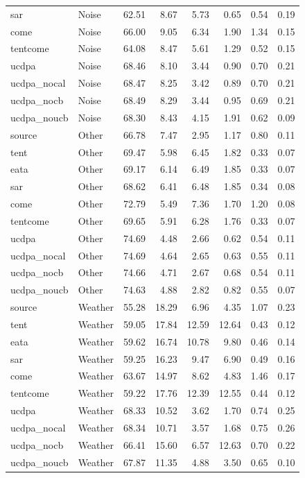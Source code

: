 \begin{tabular}{llrrrrrr}
sar & Noise & 62.51 & 8.67 & 5.73 & 0.65 & 0.54 & 0.19 \\
come & Noise & 66.00 & 9.05 & 6.34 & 1.90 & 1.34 & 0.15 \\
tentcome & Noise & 64.08 & 8.47 & 5.61 & 1.29 & 0.52 & 0.15 \\
ucdpa & Noise & 68.46 & 8.10 & 3.44 & 0.90 & 0.70 & 0.21 \\
ucdpa_nocal & Noise & 68.47 & 8.25 & 3.42 & 0.89 & 0.70 & 0.21 \\
ucdpa_nocb & Noise & 68.49 & 8.29 & 3.44 & 0.95 & 0.69 & 0.21 \\
ucdpa_noucb & Noise & 68.30 & 8.43 & 4.15 & 1.91 & 0.62 & 0.09 \\
source & Other & 66.78 & 7.47 & 2.95 & 1.17 & 0.80 & 0.11 \\
tent & Other & 69.47 & 5.98 & 6.45 & 1.82 & 0.33 & 0.07 \\
eata & Other & 69.17 & 6.14 & 6.49 & 1.85 & 0.33 & 0.07 \\
sar & Other & 68.62 & 6.41 & 6.48 & 1.85 & 0.34 & 0.08 \\
come & Other & 72.79 & 5.49 & 7.36 & 1.70 & 1.20 & 0.08 \\
tentcome & Other & 69.65 & 5.91 & 6.28 & 1.76 & 0.33 & 0.07 \\
ucdpa & Other & 74.69 & 4.48 & 2.66 & 0.62 & 0.54 & 0.11 \\
ucdpa_nocal & Other & 74.69 & 4.64 & 2.65 & 0.63 & 0.55 & 0.11 \\
ucdpa_nocb & Other & 74.66 & 4.71 & 2.67 & 0.68 & 0.54 & 0.11 \\
ucdpa_noucb & Other & 74.63 & 4.88 & 2.82 & 0.82 & 0.55 & 0.07 \\
source & Weather & 55.28 & 18.29 & 6.96 & 4.35 & 1.07 & 0.23 \\
tent & Weather & 59.05 & 17.84 & 12.59 & 12.64 & 0.43 & 0.12 \\
eata & Weather & 59.62 & 16.74 & 10.78 & 9.80 & 0.46 & 0.14 \\
sar & Weather & 59.25 & 16.23 & 9.47 & 6.90 & 0.49 & 0.16 \\
come & Weather & 63.67 & 14.97 & 8.62 & 4.83 & 1.46 & 0.17 \\
tentcome & Weather & 59.22 & 17.76 & 12.39 & 12.55 & 0.44 & 0.12 \\
ucdpa & Weather & 68.33 & 10.52 & 3.62 & 1.70 & 0.74 & 0.25 \\
ucdpa_nocal & Weather & 68.34 & 10.71 & 3.57 & 1.68 & 0.75 & 0.26 \\
ucdpa_nocb & Weather & 66.41 & 15.60 & 6.57 & 12.63 & 0.70 & 0.22 \\
ucdpa_noucb & Weather & 67.87 & 11.35 & 4.88 & 3.50 & 0.65 & 0.10 \\
\bottomrule
\end{tabular}
